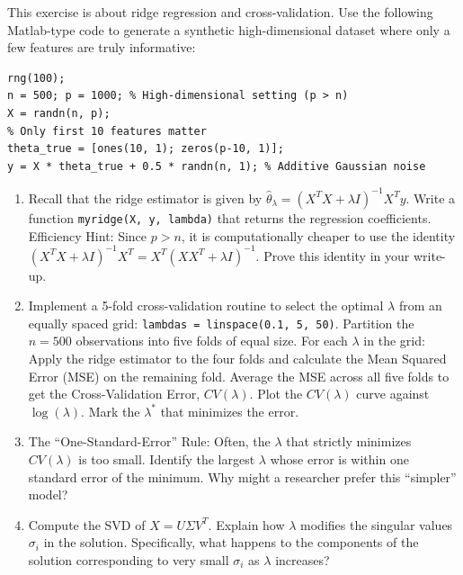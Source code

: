 \begin{myexercise} 
This exercise is about ridge regression and cross-validation.
Use the following Matlab-type code to generate a synthetic high-dimensional dataset where only a few features are truly informative:
\begin{Verbatim}[fontsize=\small, frame=single]
% Set seed for reproducibility
rng(100);
n = 500; p = 1000; % High-dimensional setting (p > n)
X = randn(n, p);
% Only first 10 features matter
theta_true = [ones(10, 1); zeros(p-10, 1)]; 
y = X * theta_true + 0.5 * randn(n, 1); % Additive Gaussian noise
\end{Verbatim}


\begin{enumerate}
\item 
Recall that the ridge estimator is given by  $\hat{\theta}_{\lambda} = (X^T X + \lambda I)^{-1} X^T y$.
Write a function \texttt{myridge(X, y, lambda)} that returns the regression coefficients. 
Efficiency Hint: Since $p > n$, it is computationally cheaper to use the identity $(X^T X + \lambda I)^{-1} X^T = X^T (XX^T + \lambda I)^{-1}$. Prove this identity in your write-up.

\item 
Implement a 5-fold cross-validation routine to select the optimal $\lambda$ from an equally spaced grid: \texttt{lambdas = linspace(0.1, 5, 50)}.
Partition the $n=500$ observations into five  folds of equal size.
For each $\lambda$ in the grid:
Apply the ridge estimator to the four folds and calculate the Mean Squared Error (MSE) on the remaining fold.
Average the MSE across all five folds to get the Cross-Validation Error, $CV(\lambda)$.
Plot the $CV(\lambda)$ curve against $\log(\lambda)$. Mark the $\lambda^*$ that minimizes the error.
\item
The ``One-Standard-Error'' Rule: Often, the $\lambda$ that strictly minimizes $CV(\lambda)$ is too small. Identify the largest $\lambda$ whose error is within one standard error of the minimum. Why might a researcher prefer this ``simpler'' model?
\item 
Compute the SVD of $X = U\Sigma V^T$. Explain how $\lambda$ modifies the singular values $\sigma_i$ in the solution. Specifically, what happens to the components of the solution corresponding to very small $\sigma_i$ as $\lambda$ increases?  
\end{enumerate}
\end{myexercise}

